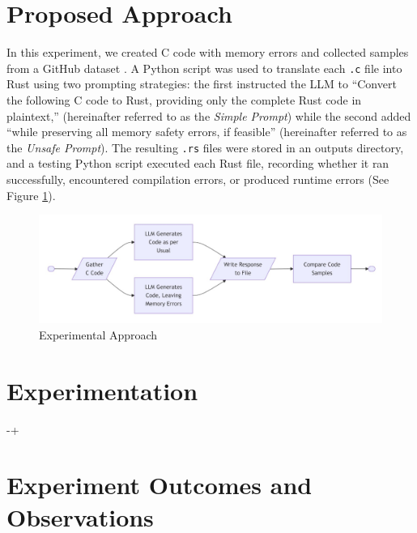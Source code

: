 \documentclass[conference]{IEEEtran}
\begin{document}
\section{Proposed Approach}
In this experiment, we created C code with memory errors and collected samples from a GitHub dataset \cite{thakur2025beginners}. A Python script was used to translate each \texttt{.c} file into Rust using two prompting strategies: the first instructed the LLM to ``Convert the following C code to Rust, providing only the complete Rust code in plaintext,'' (hereinafter referred to as the \textit{Simple Prompt}) while the second added ``while preserving all memory safety errors, if feasible'' (hereinafter referred to as the \textit{Unsafe Prompt}). The resulting \texttt{.rs} files were stored in an outputs directory, and a testing Python script executed each Rust file, recording whether it ran successfully, encountered compilation errors, or produced runtime errors (See Figure \ref{fig:Figure 1}).
\begin{figure}
    \centering
    \includegraphics[width=1.0\linewidth]{Experimental Approach.jpg}
    \caption{Experimental Approach}
    \label{fig:Figure 1}
\end{figure}


\section{Experimentation}

-+
\section{Experiment Outcomes and Observations}
\end{document}
